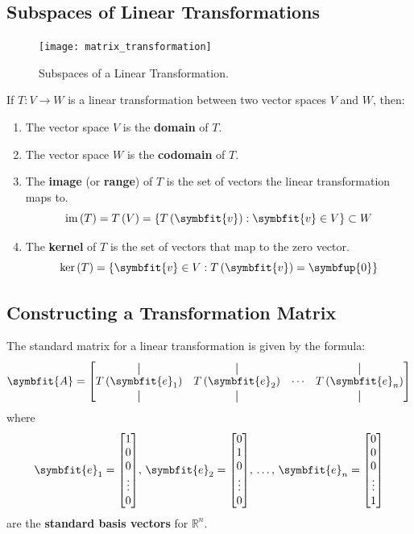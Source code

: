 \documentclass{article}
\begin{document}
	\subsection{Subspaces of Linear Transformations}
	\begin{figure}[H]
		\centering
		\texttt{[image: matrix\_transformation]}
		\caption{Subspaces of a Linear Transformation.}
	\end{figure}
	\begin{definition}
		If $T:V \rightarrow W$ is a linear transformation between two vector spaces $V$ and $W$, then:
		\begin{enumerate}
			\item The vector space $V$ is the \textbf{domain} of $T$.
			\item The vector space $W$ is the \textbf{codomain} of $T$.
			\item The \textbf{image} (or \textbf{range}) of $T$ is the set of vectors the linear transformation maps to.
			\begin{equation*}
				\vim{\left( T \right)} = \func{T}{V} = \left\{ \func{T}{\symbfit{v}} : \symbfit{v}\in V \right\} \subset W
			\end{equation*}
			\item The \textbf{kernel} of $T$ is the set of vectors that map to the zero vector.
			\begin{equation*}
				\vker{\left( T \right)} = \left\{ \symbfit{v}\in V : \func{T}{\symbfit{v}}=\symbfup{0} \right\}
			\end{equation*}
		\end{enumerate}
	\end{definition}
	\subsection{Constructing a Transformation Matrix}
	\begin{theorem}
		The standard matrix for a linear transformation is given by the formula:
		\begin{equation*}
			\symbfit{A} = \mqty[
				\vertbar & \vertbar & & \vertbar \\ 
				\func{T}{\symbfit{e}_1} & \func{T}{\symbfit{e}_2} & \cdots & \func{T}{\symbfit{e}_n} \\ 
				\vertbar & \vertbar & & \vertbar
			]
		\end{equation*}
		where
		\begin{equation*}
			\symbfit{e}_1 = \mqty[1 \\ 0 \\ 0 \\ \vdots \\ 0],\, \symbfit{e}_2 = \mqty[0 \\ 1 \\ 0 \\ \vdots \\ 0],\, \dots,\, \symbfit{e}_n = \mqty[0 \\ 0 \\ 0 \\ \vdots \\ 1]
		\end{equation*}
		are the \textbf{standard basis vectors} for $\mathbb{R}^n$.
	\end{theorem}
	\newpage
\end{document}
